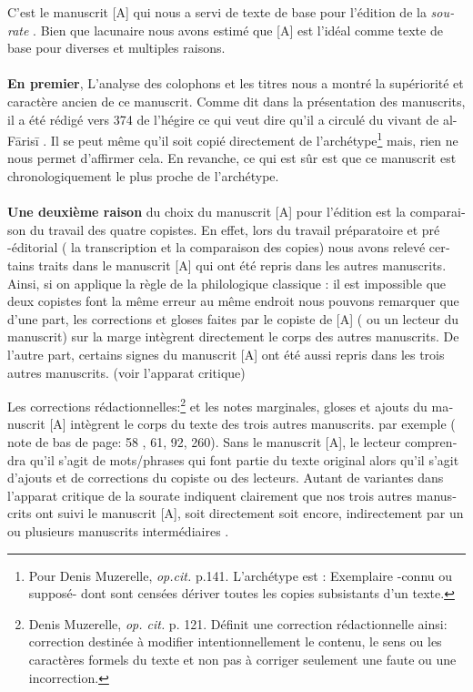 \documentclass[a4paper,12pt]{report}
\begin{document}
\begin{itemize}
\begin{enumerate}
\begin{french}
C’est le manuscrit [A] qui nous a servi de texte de base pour l’édition de la \textit{sourate} . Bien que lacunaire nous avons estimé que [A]  est l’idéal comme texte de base pour diverses et multiples  raisons. 

\paragraph{}
\textbf{En premier}, L’analyse des colophons et les titres  nous a montré la supériorité et  caractère ancien de ce manuscrit. Comme dit dans la présentation des manuscrits, il a été rédigé vers 374 de l'hégire ce qui veut dire qu’il a circulé du vivant de al-Fārisī . Il se peut même qu’il soit  copié  directement de l’archétype\footnote{Pour Denis Muzerelle, \textit{op.cit.}  p.141. L’archétype est : Exemplaire -connu ou supposé- dont sont censées dériver toutes les copies subsistants d’un texte.   }  mais, rien ne nous permet d’affirmer cela. En revanche, ce qui est sûr est que ce manuscrit est chronologiquement  le plus proche de l’archétype. 
\paragraph{}

\textbf{Une deuxième raison} du choix  du manuscrit [A]  pour l’édition est la comparaison du travail des quatre copistes. En effet, lors  du travail préparatoire et pré -éditorial ( la transcription et la comparaison des copies)  nous avons relevé certains traits dans le  manuscrit [A] qui ont été repris dans les autres manuscrits. Ainsi, si on applique la règle de la philologique classique : il est impossible que deux copistes font la même erreur au même endroit nous pouvons  remarquer que d'une part, les corrections et gloses  faites par le copiste de [A] ( ou un lecteur du manuscrit)  sur la marge intègrent directement le corps des autres manuscrits. De l'autre part, certains signes du manuscrit [A] ont été aussi repris dans les trois autres manuscrits. (voir l'apparat critique)

	Les corrections rédactionnelles:\footnote{Denis Muzerelle,  \textit{op. cit.} p. 121. Définit une  correction rédactionnelle  ainsi: correction destinée à modifier intentionnellement le contenu, le sens ou les caractères formels du texte et non pas à corriger seulement une faute ou une incorrection.  }  et les notes marginales, gloses et ajouts  du manuscrit [A] intègrent le  corps du texte des trois autres manuscrits. par exemple ( note de bas de page: 58 , 61, 92, 260). Sans le manuscrit [A], le lecteur comprendra qu'il s'agit de mots/phrases qui font partie du texte original alors qu'il s'agit d'ajouts et de corrections du copiste ou des lecteurs. 
 Autant de variantes dans l'apparat critique de la sourate indiquent clairement que nos trois autres manuscrits ont suivi  le manuscrit [A], soit directement soit encore,  indirectement par un ou plusieurs manuscrits intermédiaires . 


\end{french}
\end{enumerate}
\end{itemize}
\end{document}
